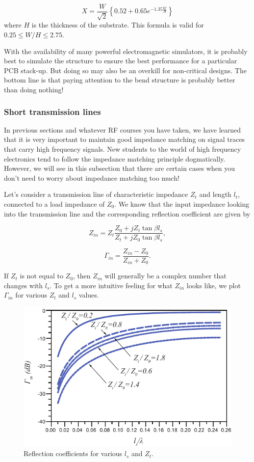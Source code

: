 \documentclass[12pt,letterpaper]{scrartcl}
\begin{document}
\[
X = \frac{W}{\sqrt{2}} \left\{0.52 + 0.65e^{ -1.35\frac{W}{ H}}    \right\}
\]
where $H$ is the thickness of the substrate. This formula is valid for $0.25\leq W/H \leq 2.75$. 

With the availability of many powerful electromagnetic simulators, it is probably best to simulate the structure to ensure the best performance for a particular PCB stack-up. But doing so may also be an overkill for non-critical designs. The bottom line is that paying attention to the bend structure is probably better than doing nothing!

\subsubsection{Short transmission lines}\label{sec:short-tline}

In previous sections and whatever RF courses you have taken, we have learned that it is very important to maintain good impedance matching on signal traces that carry high frequency signals. New students to the world of high frequency electronics tend to follow the impedance matching principle dogmatically. However, we will see in this subsection that there are certain cases when you don't need to worry about impedance matching too much!

Let's consider a transmission line of characteristic impedance $Z_t$ and length $l_t$, connected to a load impedance of $Z_0$. We know that the input impedance looking into the transmission line and the corresponding reflection coefficient are given by

\[
Z_{in} = Z_t \frac{Z_0 + j Z_t \tan \beta l_s}{Z_t + j Z_0 \tan \beta l_s},
\]

\[
\Gamma_{in} = \frac{Z_{in}-Z_0}{Z_{in}+Z_0}.
\]

If $Z_t$ is not equal to $Z_0$, then $Z_{in}$ will generally be a complex number that changes with $l_s$. To get a more intuitive feeling for what $Z_{in}$ looks like, we plot $\Gamma_{in}$ for various $Z_t$ and $l_s$ values. 

\begin{figure}[ht]
	\centering
	\includegraphics{short-tline-gamma}
	\caption{Reflection coefficients for various $l_s$ and $Z_t$.}
	\label{fig:short-tline-gamma}
\end{figure}
\end{document}
